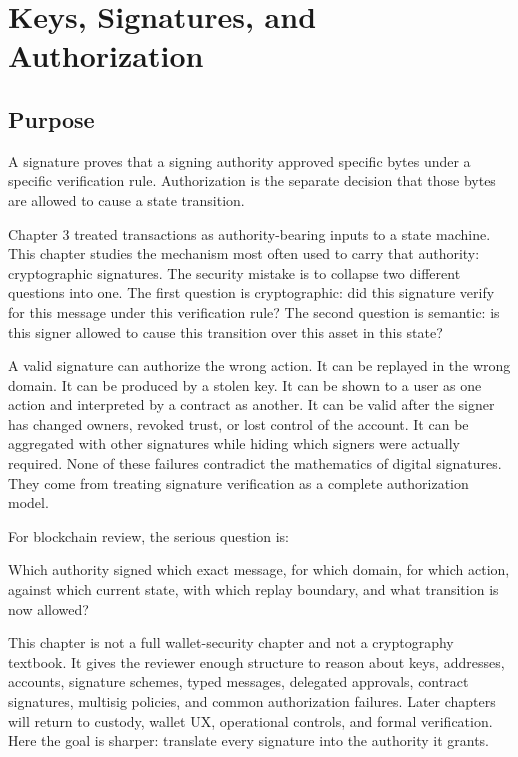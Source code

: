 \chapter{Keys, Signatures, and Authorization}

\section{Purpose}

\begin{principlebox}
A signature proves that a signing authority approved specific bytes under a specific verification rule. Authorization is the separate decision that those bytes are allowed to cause a state transition.
\end{principlebox}

Chapter 3 treated transactions as authority-bearing inputs to a state machine. This chapter studies the mechanism most often used to carry that authority: cryptographic signatures. The security mistake is to collapse two different questions into one. The first question is cryptographic: did this signature verify for this message under this verification rule? The second question is semantic: is this signer allowed to cause this transition over this asset in this state?

A valid signature can authorize the wrong action. It can be replayed in the wrong domain. It can be produced by a stolen key. It can be shown to a user as one action and interpreted by a contract as another. It can be valid after the signer has changed owners, revoked trust, or lost control of the account. It can be aggregated with other signatures while hiding which signers were actually required. None of these failures contradict the mathematics of digital signatures. They come from treating signature verification as a complete authorization model.

For blockchain review, the serious question is:

\begin{codeblock}
Which authority signed which exact message,
for which domain,
for which action,
against which current state,
with which replay boundary,
and what transition is now allowed?
\end{codeblock}

This chapter is not a full wallet-security chapter and not a cryptography textbook. It gives the reviewer enough structure to reason about keys, addresses, accounts, signature schemes, typed messages, delegated approvals, contract signatures, multisig policies, and common authorization failures. Later chapters will return to custody, wallet UX, operational controls, and formal verification. Here the goal is sharper: translate every signature into the authority it grants.

